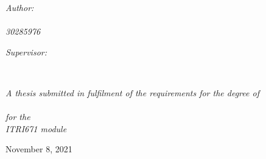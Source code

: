 \documentclass[
12pt, %
oneside, %
english, %
onehalfspacing, %
headsepline, %
]{MastersDoctoralThesis} %
\begin{document}
\begin{titlepage}
\begin{center}
\begin{minipage}[t]{0.4\textwidth}
\begin{flushleft} \large
\emph{Author:}\\
\href{mailto:joshua.esterhuizen27@gmail.com}{\authorname} \\ %
\textit{30285976}
\end{flushleft}
\end{minipage}
\begin{minipage}[t]{0.4\textwidth}
\begin{flushright} \large
\emph{Supervisor:} \\
\href{mailto:Gunther.Drevin@nwu.ac.za}{\supname} %
\end{flushright}
\end{minipage}\\[3cm]
 
\vfill

\large \textit{A thesis submitted in fulfilment of the requirements for the degree of \\ \degreename}\\[0.3cm] %
\large \textit{for the}\\
\large \textit{ITRI671 module}\\
\vfill

{\large November 8, 2021}\\[4cm] %
 
\vfill
\end{center}
\end{titlepage}

\end{document}
